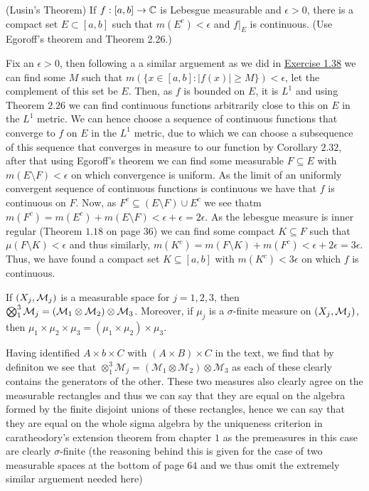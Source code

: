 \documentclass[12pt,a4paper]{article}
\begin{document}
\begin{problem}\label{prob:2-44}
(Lusin's Theorem) If $f: [a, b] \to \mathbb{C}$ is Lebesgue measurable and $\epsilon > 0$, there is a compact set $E \subset [a, b]$ such that $m(E^c) < \epsilon$ and $f|_E$ is continuous. (Use Egoroff's theorem and Theorem 2.26.)
\end{problem}
\begin{solution}
	Fix an $\epsilon>0$, then following a a similar arguement as we did in \hyperref[prob:2-38]{Exercise 1.38} we can find some $M$ such that $m(\{x\in [a,b]:|f(x)|\geq M\})<\epsilon$, let the complement of this set be $E$. 
	Then, as $f$ is bounded on $E$, it is $L^1$ and using Theorem $2.26$ we can find continuous functions arbitrarily close to this on $E$ in the $L^1$ metric. 
	We can hence choose a sequence of continuous functions that converge to $f$ on $E$ in the $L^1$ metric, due to which we can choose a subsequence of this sequence that converges in measure to our function by Corollary $2.32$, after that using Egoroff's theorem we can find some measurable $F\subseteq E$ with $m(E\setminus F)<\epsilon$ on which convergence is uniform. 
	As the limit of an uniformly convergent sequence of continuous functions is continuous we have that $f$ is continuous on $F$. 
	Now, as $F^c\subseteq(E\setminus F)\cup E^c$ we see thatm $m(F^c)=m(E^c)+m(E\setminus F)<\epsilon+\epsilon=2\epsilon$. 
	As the lebesgue measure is inner regular (Theorem $1.18$ on page $36$) we can find some compact $K\subseteq F$ such that $\mu(F\setminus K)<\epsilon$ and thus similarly, $m(K^c)=m(F\setminus K)+m(F^c)<\epsilon+2\epsilon=3\epsilon.$
	Thus, we have found a compact set $K\subseteq[a,b]$ with $m(K^c)<3\epsilon$ on which $f$ is continuous.
\end{solution}
\begin{problem}\label{prob:2-45}
If $(X_j, \mathcal{M}_j)$ is a measurable space for $j = 1, 2, 3$, then $\bigotimes_1^3 \mathcal{M}_j = (\mathcal{M}_1 \otimes \mathcal{M}_2) \otimes \mathcal{M}_3$. Moreover, if $\mu_j$ is a $\sigma$-finite measure on $(X_j, \mathcal{M}_j)$, then $\mu_1 \times \mu_2 \times \mu_3 = (\mu_1 \times \mu_2) \times \mu_3$.
\end{problem}
\begin{solution}
    Having identified $A\times b\times C$ with $(A\times B)\times C$ in the text, we find that by definiton we see that $\otimes^3_1\mathcal M_j=(\mathcal M_1\otimes\mathcal M_2)\otimes\mathcal M_3$ as each of these clearly contains the generators of the other.
	These two measures also clearly agree on the measurable rectangles and thus we can say that they are equal on the algebra formed by the finite disjoint unions of these rectangles, hence we can say that they are equal on the whole sigma algebra by the uniqueness criterion in caratheodory's extension theorem from chapter $1$ as the premeasures in this case are clearly $\sigma$-finite (the reasoning behind this is given for the case of two measurable spaces at the bottom of page $64$ and we thus omit the extremely similar arguement needed here)
\end{solution}
\end{document}
